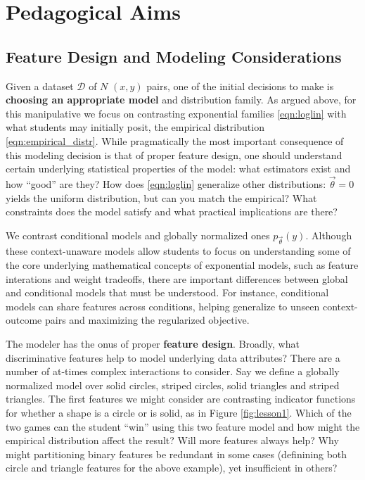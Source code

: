 \documentclass[11pt,letterpaper]{article}
\newcommand{\Data}[0]{\ensuremath{\mathcal{D}}}
\begin{document}
\section{Pedagogical Aims}\label{sec:aims}

\subsection{Feature Design and Modeling Considerations}

Given a dataset $\Data{}$ of $N$ $(x, y)$ pairs, one of the initial decisions 
to make is \textbf{choosing an appropriate model} and distribution family. 
As argued above, for this manipulative we focus on contrasting exponential families 
\eqref{eqn:loglin} with what students may initially posit, the empirical 
distribution \eqref{eqn:empirical_distr}. While pragmatically the most important 
consequence of this modeling decision is that of proper feature design, one should 
understand certain underlying statistical properties of the model: what estimators 
exist and how ``good'' are they? How does \eqref{eqn:loglin} generalize other 
distributions: $\vec{\theta} = 0$ yields the uniform distribution, but can you match 
the empirical? What constraints does the model satisfy and what practical implications
are there?
 
We contrast conditional models and globally normalized ones
$p_{\vec{\theta}}\left(y\right)$. Although
these context-unaware models allow students to focus on
understanding some of the core underlying mathematical concepts of
exponential models, such as feature interations and weight tradeoffs,
there are important differences between global and conditional models
that must be understood. For instance, conditional models can share 
features across conditions, helping generalize to unseen context-outcome 
pairs and maximizing the regularized objective.

The modeler has the onus of proper \textbf{feature design}. Broadly, what discriminative features 
help to model underlying data attributes? There are a number of at-times complex interactions 
to consider. Say we define a globally 
normalized model over solid circles, striped circles, solid triangles and striped triangles. 
The first features we might consider are contrasting indicator functions for whether a shape
is a circle or is solid, as in Figure \ref{fig:lesson1}. Which of the two games can the student 
``win'' using this two feature model and how might the empirical distribution affect the result? 
Will more features always help? Why might partitioning binary 
features be redundant in some cases (definining both circle and triangle features for the above example), 
yet insufficient in others?
\end{document}
